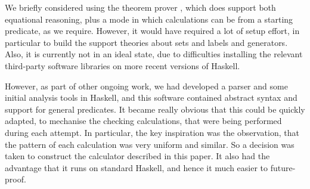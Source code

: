 We briefly considered using the  theorem prover
\cite{DBLP:conf/utp/Butterfield10,DBLP:conf/utp/Butterfield12},
which does support both equational reasoning,
plus a mode in which calculations can be from a starting predicate,
as we require.
However, it would have required a lot of setup effort,
in particular to build the support theories about sets and labels
and generators.
Also, it is currently not in an ideal state,
due to difficulties installing
the relevant third-party software libraries
on more recent versions of Haskell.

However, as part of other ongoing work,
we had developed a parser and some initial analysis tools
in Haskell\cite{Haskell2010},
and this software contained abstract syntax and support
for general predicates.
It became really obvious that this could be quickly adapted,
to mechanise the checking calculations, that were being performed
during each attempt.
In particular,
the key inspiration was the observation,
that the pattern of each calculation was very uniform and similar.
So a decision was taken to construct the calculator described in this paper.
It also had the advantage that it runs on standard Haskell,
and hence it much easier to future-proof.
